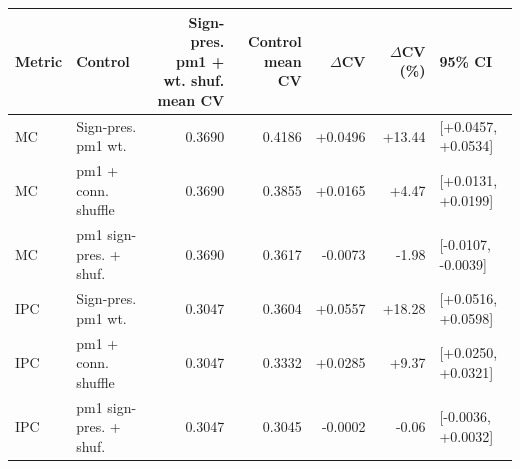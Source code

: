 \begin{tabular}{llrrrrl}
\toprule
Metric & Control & Sign-pres. pm1 + wt. shuf. mean CV & Control mean CV & $\Delta$CV & $\Delta$CV (\%) & 95\% CI \\
\midrule
MC & Sign-pres. pm1 wt. & 0.3690 & 0.4186 & +0.0496 & +13.44 & [+0.0457, +0.0534] \\
MC & pm1 + conn. shuffle & 0.3690 & 0.3855 & +0.0165 & +4.47 & [+0.0131, +0.0199] \\
MC & pm1 sign-pres. + shuf. & 0.3690 & 0.3617 & -0.0073 & -1.98 & [-0.0107, -0.0039] \\
IPC & Sign-pres. pm1 wt. & 0.3047 & 0.3604 & +0.0557 & +18.28 & [+0.0516, +0.0598] \\
IPC & pm1 + conn. shuffle & 0.3047 & 0.3332 & +0.0285 & +9.37 & [+0.0250, +0.0321] \\
IPC & pm1 sign-pres. + shuf. & 0.3047 & 0.3045 & -0.0002 & -0.06 & [-0.0036, +0.0032] \\
\bottomrule
\end{tabular}
